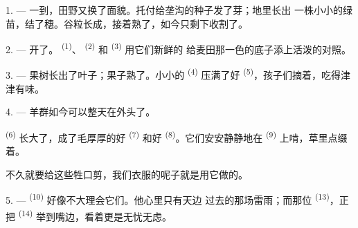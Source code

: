 %


\VUsaut{5.0mm}
\VUsaut{3.0mm}
\VUsaut{3.0mm}
\VUsaut{4.0mm}
\VUsaut{3.0mm}

1. --- 一到，田野又换了面貌。托付给垄沟的种子发了芽；地里长出
一株小小的绿苗，结了穗。谷粒长成，接着熟了，如今只剩下收割了。

2. --- 开了。 \textsuperscript{(1)}、
\textsuperscript{(2)} 和 \textsuperscript{(3)} 用它们新鲜的
给麦田那一色的底子添上活泼的对照。

3. --- 果树长出了叶子；果子熟了。小小的 \textsuperscript{(4)}
压满了好 \textsuperscript{(5)}，孩子们摘着，吃得津津有味。

4. --- 羊群如今可以整天在外头了。

 \textsuperscript{(6)} 长大了，成了毛厚厚的好
\textsuperscript{(7)} 和好 \textsuperscript{(8)}。它们安安静静地在
 \textsuperscript{(9)} 上啃，草里点缀着。

不久就要给这些牲口剪，我们衣服的呢子就是用它做的。

\VUsaut{5.0mm}
\VUsaut{3.4mm}

5. ---  \textsuperscript{(10)} 好像不大理会它们。他心里只有天边
过去的那场雷雨；而那位 \textsuperscript{(13)}，正把
 \textsuperscript{(14)} 举到嘴边，看着更是无忧无虑。

